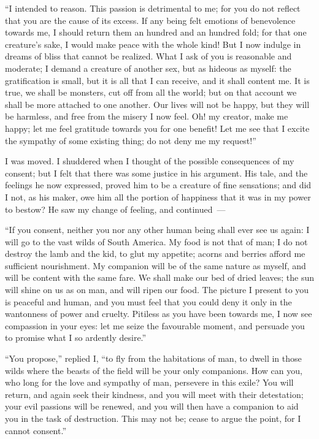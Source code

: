``I intended to reason. This passion
is detrimental to me; for you do not
reflect that you are the cause of its
excess. If any being felt emotions of
benevolence towards me, I should return
them an hundred and an hundred
fold; for that one creature's sake, I
would make peace with the whole kind!
But I now indulge in dreams of bliss
that cannot be realized. What I ask
of you is reasonable and moderate; I
demand a creature of another sex, but
as hideous as myself: the gratification
is small, but it is all that I can receive,
and it shall content me. It is true, we
shall be monsters, cut off from all the
world; but on that account we shall be
more attached to one another. Our lives
will not be happy, but they will be
harmless, and free from the misery I
now feel. Oh! my creator, make me
happy; let me feel gratitude towards
you for one benefit! Let me see
that I excite the sympathy of some
existing thing; do not deny me my request!''

I was moved. I shuddered when I
thought of the possible consequences
of my consent; but I felt that there was
some justice in his argument. His
tale, and the feelings he now expressed,
proved him to be a creature of fine sensations;
and did I not, as his maker,
owe him all the portion of happiness
that it was in my power to bestow? He
saw my change of feeling, and continued~---

``If you consent, neither you nor
any other human being shall ever see us
again: I will go to the vast wilds of
South America. My food is not that of
man; I do not destroy the lamb and
the kid, to glut my appetite; acorns
and berries afford me sufficient nourishment.
My companion will be of the
same nature as myself, and will be content
with the same fare. We shall
make our bed of dried leaves; the sun
will shine on us as on man, and will
ripen our food. The picture I present
to you is peaceful and human, and you
must feel that you could deny it only in
the wantonness of power and cruelty.
Pitiless as you have been towards me,
I now see compassion in your eyes:
let me seize the favourable moment,
and persuade you to promise what I
so ardently desire.''

``You propose,'' replied I, ``to fly
from the habitations of man, to dwell in
those wilds where the beasts of the
field will be your only companions.
How can you, who long for the love
and sympathy of man, persevere in this
exile? You will return, and again
seek their kindness, and you will meet
with their detestation; your evil passions
will be renewed, and you will then
have a companion to aid you in the task
of destruction. This may not be;
cease to argue the point, for I cannot
consent.''

